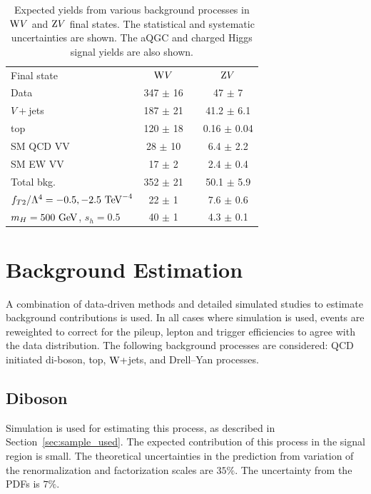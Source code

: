 \begin{table}[!htbp]
  \begin{center}
  \begin{tabular} {lccc}
  \hline
  \hline
  Final state 	& $\mathrm{W} V$ &	& $\mathrm{Z} V$ 	\\
  \cline{2-2} \cline{4-4}
  Data 	& 347 $\pm$ 16 && 47 $\pm$ 7 \\
  \hline
  $V+$jets    	      &   187 $\pm$ 21  &&    41.2 $\pm$ 6.1    \\
  top       	      &   120 $\pm$  18  &&    0.16 $\pm$  0.04    \\
  SM QCD VV  	      &   28 $\pm$  10  &&    6.4 $\pm$  2.2      \\
  SM EW VV  	      &   17 $\pm$  2  &&    2.4 $\pm$  0.4      \\
  \hline
  Total bkg.            &   352 $\pm$  21   &&    50.1 $\pm$  5.9   \\[1ex]
  $f_{T2}/ \Lambda^{4} = -0.5,-2.5~\mathrm{TeV}^{-4}$    &   22 $\pm$ 1 && 7.6 $\pm$ 0.6\\
  $m_{H}=500~\mathrm{GeV}$, $s_{h}=0.5$      &   40 $\pm$ 1 && 4.3 $\pm$ 0.1\\
  \hline
  \end{tabular}
\caption{Expected yields from various background processes in $\mathrm{W} V$ and $\mathrm{Z} V$ final states. The statistical and systematic uncertainties are shown. The aQGC and charged Higgs signal yields are also shown.}
\label{tab:sel_yields15}
  \end{center}
\end{table}


\section{Background Estimation} %
\label{sec:background_estimation}
A combination of data-driven methods and detailed simulated studies to 
estimate background contributions is used. In all cases where simulation is used, events are reweighted to correct for the pileup, lepton and trigger efficiencies to agree with the data distribution. The following background processes are considered: QCD initiated di-boson, top, $\mathrm{W}+$jets, and Drell--Yan processes. 

\subsection{Diboson}
Simulation is used for estimating this process, as described in Section~\ref{sec:sample_used}. The expected contribution of this process in the signal region is small. The theoretical uncertainties in the prediction from variation of the renormalization and factorization scales are $35\%$. The uncertainty from the PDFs is $7\%$.

